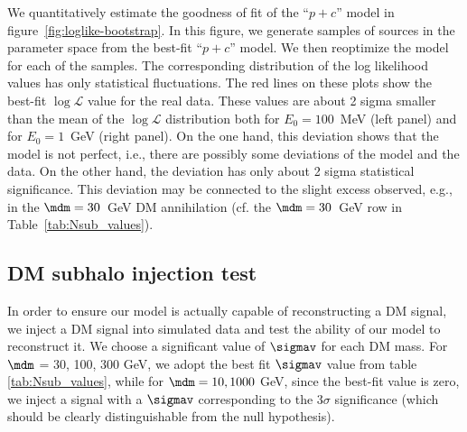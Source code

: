 We quantitatively estimate the goodness of fit of the ``$p + c$'' model in figure~\ref{fig:loglike-bootstrap}.
In this figure, we generate samples of sources in the parameter space from the best-fit ``$p + c$'' model. We then reoptimize the model for each of the samples.
The corresponding distribution of the log likelihood values has only statistical fluctuations.
The red lines on these plots show the best-fit $\log \mathcal{L}$ value for the real data.
These values are about 2 sigma smaller than the mean of the $\log \mathcal{L}$ distribution both for $E_0 = 100$~MeV (left panel) and for $E_0 = 1$~GeV (right panel).
On the one hand, this deviation shows that the model is not perfect, i.e., there are possibly some deviations of the model and the data.
On the other hand, the deviation has only about 2 sigma statistical significance.
This deviation may be connected to the slight excess observed, e.g., in the $\mdm = 30$~GeV DM annihilation (cf. the $\mdm = 30$~GeV row in Table~\ref{tab:Nsub_values}).


\subsection{DM subhalo injection test}
\label{app:DM_injection}

In order to ensure our model is actually capable of reconstructing a DM signal, we inject a DM signal into simulated data and test the ability of our model to reconstruct it.
We choose a significant value of $\sigmav$ for each DM mass. For $\mdm$ = 30, 100, 300 GeV, we adopt the best fit $\sigmav$ value from table \ref{tab:Nsub_values}, while for $\mdm = 10, 1000$ GeV, since the best-fit value is zero, we inject a signal with a $\sigmav$ corresponding to the 3$\sigma$ significance (which should be clearly distinguishable from the null hypothesis). 

